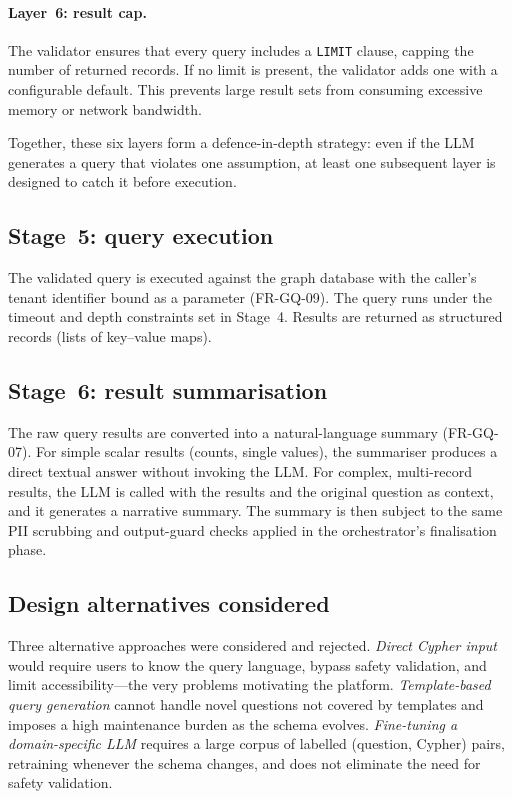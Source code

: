 \documentclass[a4paper]{sapthesis}
\begin{document}
\paragraph{Layer~6: result cap.}
The validator ensures that every query includes a \texttt{LIMIT} clause,
capping the number of returned records.  If no limit is present, the
validator adds one with a configurable default.  This prevents large
result sets from consuming excessive memory or network bandwidth.

Together, these six layers form a defence-in-depth strategy: even if the
LLM generates a query that violates one assumption, at least one subsequent
layer is designed to catch it before execution.

\subsection{Stage~5: query execution}

The validated query is executed against the graph database with the
caller's tenant identifier bound as a parameter (FR-GQ-09).  The query
runs under the timeout and depth constraints set in Stage~4.  Results
are returned as structured records (lists of key--value maps).

\subsection{Stage~6: result summarisation}

The raw query results are converted into a natural-language summary
(FR-GQ-07).  For simple scalar results (counts, single values), the
summariser produces a direct textual answer without invoking the LLM.
For complex, multi-record results, the LLM is called with the results
and the original question as context, and it generates a narrative
summary.  The summary is then subject to the same PII scrubbing and
output-guard checks applied in the orchestrator's finalisation phase.

\subsection{Design alternatives considered}

Three alternative approaches were considered and rejected.  \emph{Direct
Cypher input} would require users to know the query language, bypass
safety validation, and limit accessibility---the very problems motivating
the platform.  \emph{Template-based query generation} cannot handle novel
questions not covered by templates and imposes a high maintenance burden as
the schema evolves.  \emph{Fine-tuning a domain-specific LLM} requires a
large corpus of labelled (question, Cypher) pairs, retraining whenever the
schema changes, and does not eliminate the need for safety validation.
\end{document}
